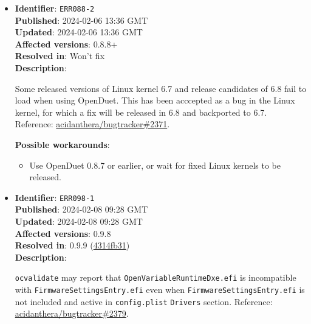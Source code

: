 \documentclass[]{article}
\providecommand{\tightlist}{%
  \setlength{\itemsep}{0pt}\setlength{\parskip}{0pt}}
\begin{document}
\begin{itemize}
  Loading macOS in OpenDuet may fail. Reference:
  \href{https://github.com/acidanthera/bugtracker/issues/2190}{acidanthera/bugtracker\#2190}.

  \textbf{Possible workarounds}:
  \begin{itemize}
    \tightlist

    \item Update OpenDuet to master version

  \end{itemize}

\item
  \textbf{Identifier}: \texttt{ERR088-2} \\
  \textbf{Published}: 2024-02-06 13:36 GMT \\
  \textbf{Updated}: 2024-02-06 13:36 GMT \\
  \textbf{Affected versions}: 0.8.8+ \\
  \textbf{Resolved in}: Won't fix \\
  \textbf{Description}:

  Some released versions of Linux kernel 6.7 and release candidates of 6.8
  fail to load when using OpenDuet. This has been acccepted as a bug in the
  Linux kernel, for which a fix will be released in 6.8 and backported to 6.7.
  Reference:
  \href{https://github.com/acidanthera/bugtracker/issues/2371#issuecomment-1929638701}{acidanthera/bugtracker\#2371}.

  \textbf{Possible workarounds}:
  \begin{itemize}
    \tightlist

    \item Use OpenDuet 0.8.7 or earlier, or wait for fixed Linux kernels to
    be released.

  \end{itemize}

\item
  \textbf{Identifier}: \texttt{ERR098-1} \\
  \textbf{Published}: 2024-02-08 09:28 GMT \\
  \textbf{Updated}: 2024-02-08 09:28 GMT \\
  \textbf{Affected versions}: 0.9.8 \\
  \textbf{Resolved in}: 0.9.9 (\href{https://github.com/acidanthera/OpenCorePkg/commit/4314fb31ecb974c30f99ac17db1f2b67ce1bb765}{4314fb31}) \\
  \textbf{Description}:

  \texttt{ocvalidate} may report that \texttt{OpenVariableRuntimeDxe.efi} is
  incompatible with \texttt{FirmwareSettingsEntry.efi} even when
  \texttt{FirmwareSettingsEntry.efi} is not included and active in \texttt{config.plist}
  \texttt{Drivers} section. Reference:
  \href{https://github.com/acidanthera/bugtracker/issues/2379}{acidanthera/bugtracker\#2379}.


\end{itemize}
\end{document}
